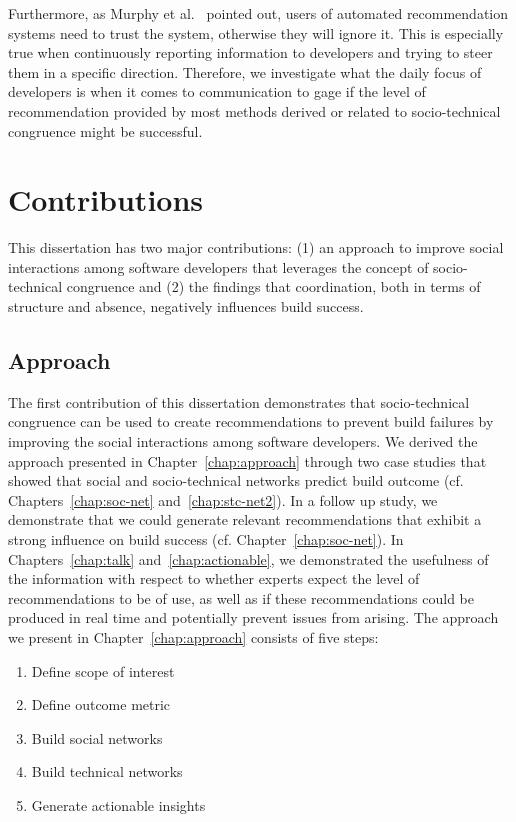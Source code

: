 Furthermore, as Murphy et al.~\cite{murphy:rsse:2010} pointed out, users of automated recommendation systems need to trust the system, otherwise they will ignore it.
This is especially true when continuously reporting information to developers and trying to steer them in a specific direction.
Therefore, we investigate what the daily focus of developers is when it comes to communication to gage if the level of recommendation provided by most methods derived or related to socio-technical congruence might be successful.




\section{Contributions}
This dissertation has two major contributions: (1) an approach to improve social interactions among software developers that leverages the concept of socio-technical congruence and (2)
the findings that coordination, both in terms of structure and absence, negatively influences build success.

\subsection{Approach}
The first contribution of this dissertation demonstrates that socio-technical congruence can be used to create recommendations to prevent build failures by improving the social interactions among software developers.
We derived the approach presented in Chapter~\ref{chap:approach} through two case studies that showed that social and socio-technical networks predict build outcome (cf. Chapters~\ref{chap:soc-net} and~\ref{chap:stc-net2}).
In a follow up study, we demonstrate that we could generate relevant recommendations that exhibit a strong influence on build success (cf. Chapter~\ref{chap:soc-net}).
In Chapters~\ref{chap:talk} and~\ref{chap:actionable}, we demonstrated the usefulness of the information with respect to whether experts expect the level of recommendations to be of use, as well as if these recommendations could be produced in real time and potentially prevent issues from arising.
The approach we present in Chapter~\ref{chap:approach} consists of five steps:

\begin{enumerate}
\item Define scope of interest
\item Define outcome metric
\item Build social networks
\item Build technical networks
\item Generate actionable insights
\end{enumerate}

